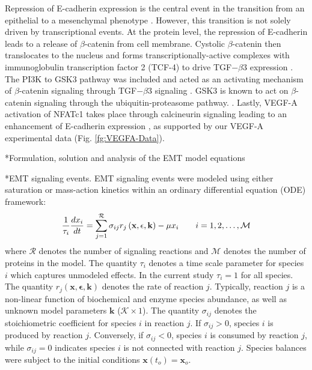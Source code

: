 \documentclass[12pt]{article}
\makeatletter
\renewcommand\subsection{\@startsection
	{subsection}{2}{0mm}
	{-0.05in}
	{-0.5\baselineskip}
	{\normalfont\normalsize\bfseries}}
\renewcommand\subsubsection{\@startsection
	{subsubsection}{2}{0mm}
	{-0.05in}
	{-0.5\baselineskip}
	{\normalfont\normalsize\itshape}}
\makeatother
\begin{document}
Repression of E-cadherin expression is the central event in the transition from an epithelial to a mesenchymal phenotype \citep{Cano:2000kh}.
However, this transition is not solely driven by transcriptional events.
At the protein level, the repression of E-cadherin leads to a release of $\beta$-catenin from cell membrane.
Cystolic $\beta$-catenin then translocates to the nucleus and forms transcriptionally-active complexes with immunoglobulin transcription factor 2 (TCF-4)
to drive TGF$-\beta$3 expression \citep{Medici:2008fk}. The PI3K to GSK3 pathway was included and acted as an activating mechanism of $\beta$-catenin signaling through TGF$-\beta$3 signaling \citep{Medici:2008fk}. GSK3 is known to act on $\beta$-catenin signaling through the ubiquitin-proteasome pathway.
\citep{Zhou:2004kx,Larue:2005vn}. Lastly, VEGF-A activation of NFATc1 takes place through calcineurin signaling leading to an enhancement of E-cadherin expression \citep{Suehiro:2014aa},
as supported by our VEGF-A experimental data (Fig. \ref{fg:VEGFA-Data}).


\subsection*{Formulation, solution and analysis of the EMT model equations}
\subsubsection*{EMT signaling events.}
EMT signaling events were modeled using either saturation or mass-action kinetics within an ordinary differential equation (ODE) framework:
\begin{equation}
	\frac{1}{\tau_{i}}\frac{dx_{i}}{dt}  =  \sum_{j = 1}^{\mathcal{R}}\sigma_{ij}r_{j}\left(\mathbf{x},\mathbf{\epsilon},\mathbf{k}\right)-\mu x_{i}\qquad{i=1,2,\hdots,\mathcal{M}}\\
\end{equation}
where $\mathcal{R}$ denotes the number of signaling reactions and $\mathcal{M}$ denotes the number of proteins in the model.
The quantity $\tau_{i}$ denotes a time scale parameter for species $i$ which captures unmodeled effects. In the current study $\tau_{i} = 1$ for all species.
The quantity $r_{j}\left(\mathbf{x},\mathbf{\epsilon},\mathbf{k}\right)$ denotes the rate of reaction $j$.
Typically, reaction $j$ is a non-linear function of biochemical and enzyme species abundance, as well as unknown model parameters $\mathbf{k}$ ($\mathcal{K}\times{1}$).
The quantity $\sigma_{ij}$ denotes the stoichiometric coefficient for species $i$ in reaction $j$.
If $\sigma_{ij}>0$, species $i$ is produced by reaction $j$.
Conversely, if $\sigma_{ij}<0$, species $i$ is consumed by reaction $j$, while $\sigma_{ij} = 0$ indicates species $i$ is not connected with reaction $j$.
Species balances were subject to the initial conditions $\mathbf{x}\left(t_{o}\right) = \mathbf{x}_{o}$.
\end{document}
